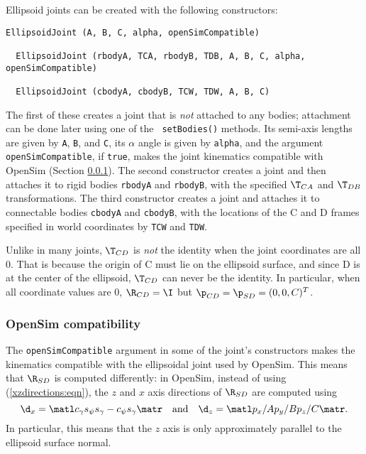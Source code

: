 Ellipsoid joints can be created with the following constructors:
%
\begin{lstlisting}[]
  EllipsoidJoint (A, B, C, alpha, openSimCompatible)

  EllipsoidJoint (rbodyA, TCA, rbodyB, TDB, A, B, C, alpha, openSimCompatible)

  EllipsoidJoint (cbodyA, cbodyB, TCW, TDW, A, B, C)
\end{lstlisting}
%
The first of these creates a joint that is {\it not} attached to any
bodies; attachment can be done later using one of the {\tt
setBodies()} methods.  Its semi-axis lengths are given by {\tt A},
{\tt B}, and {\tt C}, its $\alpha$ angle is given by {\tt alpha}, and
the argument {\tt openSimCompatible}, if {\tt true}, makes the joint
kinematics compatible with OpenSim (Section \ref{OpenSimCompat:sec}).
The second constructor creates a joint and then attaches it to rigid
bodies {\tt rbodyA} and {\tt rbodyB}, with the specified $\T_{CA}$ and
$\T_{DB}$ transformations. The third constructor creates a joint and
attaches it to connectable bodies {\tt cbodyA} and {\tt cbodyB}, with
the locations of the C and D frames specified in world coordinates by
{\tt TCW} and {\tt TDW}.

\begin{sideblock}
Unlike in many joints, $\T_{CD}$ is {\it not} the identity when the
joint coordinates are all $0$. That is because the origin of C must
lie on the ellipsoid surface, and since D is at the center of the
ellipsoid, $\T_{CD}$ can never be the identity. In particular,
when all coordinate values are 0, $\R_{CD} = \I$ but
$\p_{CD} = \p_{SD} = (0, 0, C)^T$.
\end{sideblock}

\subsubsection{OpenSim compatibility}
\label{OpenSimCompat:sec}

The {\tt openSimCompatible} argument in some of the joint's
constructors makes the kinematics compatible with the ellipsoidal
joint used by OpenSim. This means that $\R_{SD}$ is computed
differently: in OpenSim, instead of
using (\ref{xzdirections:eqn}), the $z$ and $x$ axis directions of
$\R_{SD}$ are computed using
%
\begin{equation}
\d_x = \matl c_\gamma \\ s_\psi s_\gamma \\ -c_\psi s_\gamma \matr
\quad \text{and} \quad
\d_z = \matl p_x/A \\ p_y/B \\ p_z/C \matr.
\end{equation}
%
In particular, this means that the $z$ axis is only approximately
parallel to the ellipsoid surface normal.

